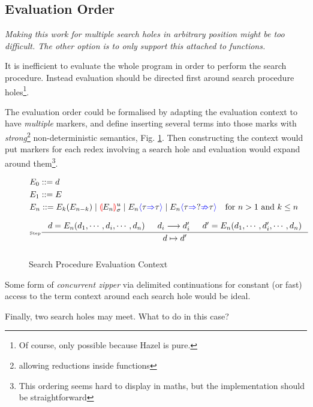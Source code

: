 \subsection{Evaluation Order}
\textit{Making this work for multiple search holes in arbitrary position might be too difficult. The other option is to only support this attached to functions.}\par
It is inefficient to evaluate the whole program in order to perform the search procedure. Instead evaluation should be directed first around search procedure holes\footnote{Of course, only possible because Hazel is pure.}.\par
The evaluation order could be formalised by adapting the evaluation context to have \textit{multiple} markers, and define inserting several terms into those marks with \textit{strong}\footnote{allowing reductions inside functions} non-deterministic semantics, Fig. \ref{fig:searchevaluationorder}. Then constructing the context would put markers for each redex involving a search hole and evaluation would expand around them\footnote{This ordering seems hard to display in maths, but the implementation should be straightforward}.

\begin{figure}[h]
\tiny
\begin{align*}
&E_0 ::= d\\
&E_1 ::= E\\
&E_n ::= E_k(E_{n-k}) \mid \hole[E_n]^u_\sigma \mid E_n\scast{\tau}{\tau} \mid E_n\scasterror{\tau}{\tau} && \text{for $n>1$ and $k\leq n$}
\end{align*} 

\[\inference[\tiny Step]{d = E_n(d_1, \cdots, d_i, \cdots, d_n) & d_i \longrightarrow d_i' & d' = E_n(d_1, \cdots,  d_i',\cdots, d_n)}{d \mapsto d'}\]
\begin{align*}

\end{align*}

\caption{Search Procedure Evaluation Context}
\label{fig:searchevaluationorder}
\end{figure}
\par
Some form of \textit{concurrent zipper} via delimited continuations \cite{ConcurrentZipper, MultiZipper} for constant (or fast) access to the term context around each search hole would be ideal.\par 
Finally, two search holes may meet. What to do in this case?

